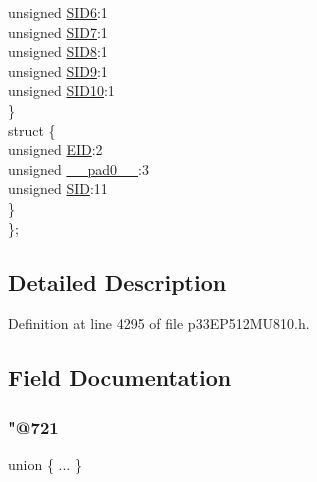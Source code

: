 \begin{DoxyCompactItemize}
\begin{tabbing}
\>\>unsigned \hyperlink{structtag_c1_r_x_f10_s_i_d_b_i_t_s_a70d70952133eb2389d5c326f9f0e8035}{SID6}:1\\
\>\>unsigned \hyperlink{structtag_c1_r_x_f10_s_i_d_b_i_t_s_a34097fb76decd431701fa2d86a22328e}{SID7}:1\\
\>\>unsigned \hyperlink{structtag_c1_r_x_f10_s_i_d_b_i_t_s_afe74894633244fdb0b0c01b4e8c522e7}{SID8}:1\\
\>\>unsigned \hyperlink{structtag_c1_r_x_f10_s_i_d_b_i_t_s_a33587704948067005c2a6a3ccc503c99}{SID9}:1\\
\>\>unsigned \hyperlink{structtag_c1_r_x_f10_s_i_d_b_i_t_s_a1a9084031c7f5fb16007feeebf0d8216}{SID10}:1\\
\>\} \\
\>struct \{\\
\>\>unsigned \hyperlink{structtag_c1_r_x_f10_s_i_d_b_i_t_s_ae80b378c9141f7c03e0b4e55b5f4b54d}{EID}:2\\
\>\>unsigned \hyperlink{structtag_c1_r_x_f10_s_i_d_b_i_t_s_adf71f3d8410c1f1dbbc96680a92c49af}{\_\_pad0\_\_}:3\\
\>\>unsigned \hyperlink{structtag_c1_r_x_f10_s_i_d_b_i_t_s_af88edf93b2fee2432665bd84f51287e4}{SID}:11\\
\>\} \\
\}; \\

\end{tabbing}\end{DoxyCompactItemize}


\subsection{Detailed Description}


Definition at line 4295 of file p33\+E\+P512\+M\+U810.\+h.



\subsection{Field Documentation}
\mbox{\label{structtag_c1_r_x_f10_s_i_d_b_i_t_s_afd7a9afe92635283cf75219b7b8c0500}} 
\subsubsection{\texorpdfstring{"@721}{@721}}
{\footnotesize\ttfamily union \{ ... \} }

\mbox{\label{structtag_c1_r_x_f10_s_i_d_b_i_t_s_adf71f3d8410c1f1dbbc96680a92c49af}} 
